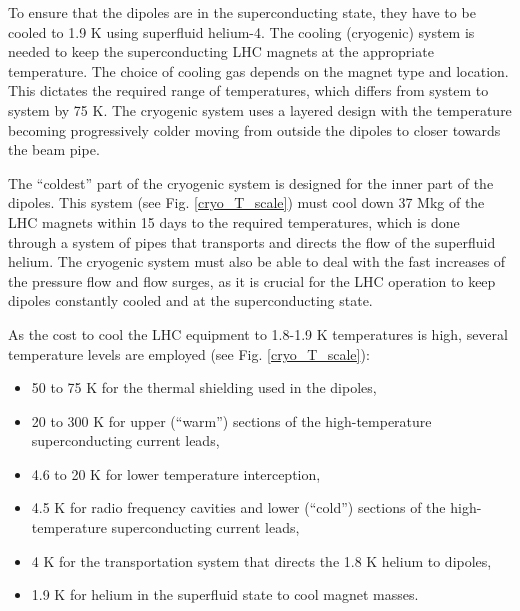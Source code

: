 \begin{normalsize}
To ensure that the dipoles are in the superconducting state, they have to be cooled to 1.9 K using superfluid helium-4. The cooling (cryogenic) system is needed to keep the superconducting LHC magnets at the appropriate temperature. The choice of cooling gas depends on the magnet type and location. This dictates the required range of temperatures, which differs from system to system by 75 K. The cryogenic system uses a layered design with the temperature becoming progressively colder moving from outside the dipoles to closer towards the beam pipe. 

The ``coldest'' part of the cryogenic system is designed for the inner part of the dipoles. This system (see Fig. \ref{cryo_T_scale}) must cool down 37 Mkg of the LHC magnets within 15 days to the required temperatures, which is done through a system of pipes that transports and directs the flow of the superfluid helium. The cryogenic system must also be able to deal with the fast increases of the pressure flow and flow surges, as it is crucial for the LHC operation to keep dipoles constantly cooled and at the superconducting state.




As the cost to cool the LHC equipment to 1.8-1.9 K temperatures is high, several temperature levels are employed (see Fig. \ref{cryo_T_scale}):
 
\begin{itemize}
\item 50 to 75 K for the thermal shielding used in the dipoles,
\item 20 to 300 K for upper (``warm'') sections of the high-temperature superconducting current leads,
\item 4.6 to 20 K for lower temperature interception,
\item 4.5 K for radio frequency cavities and lower (``cold'') sections of the high-temperature superconducting current leads,
\item 4 K for the transportation system that directs the 1.8 K helium to dipoles,
\item 1.9 K for helium in the superfluid state to cool magnet masses.
\end{itemize}


\end{normalsize}

